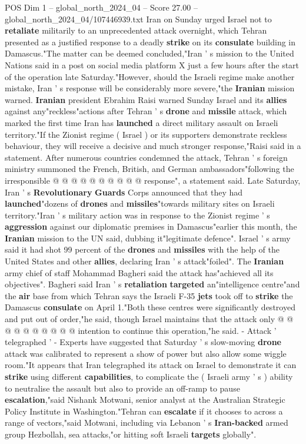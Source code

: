 \begin{textsample}{POS Dim 1 – global\_north\_2024\_04 – Score 27.00 – global\_north\_2024\_04/107446939.txt}  \label{ex:f1_pos_159}
Iran on Sunday urged Israel not to \textbf{retaliate} militarily to an unprecedented attack overnight, which Tehran presented as a justified response to a deadly \textbf{strike} on its \textbf{consulate} building in Damascus."The matter can be deemed concluded,"Iran ' s mission to the United Nations said in a post on social media platform X just a few hours after the start of the operation late Saturday."However, should the Israeli regime make another mistake, Iran ' s response will be considerably more severe,"the \textbf{Iranian} mission warned. \textbf{Iranian} president Ebrahim Raisi warned Sunday Israel and its \textbf{allies} against any"reckless"actions after Tehran ' s \textbf{drone} and \textbf{missile} attack, which marked the first time Iran has \textbf{launched} a direct military assault on Israeli territory."If the Zionist regime ( Israel ) or its supporters demonstrate reckless behaviour, they will receive a decisive and much stronger response,"Raisi said in a statement.
After numerous countries condemned the attack, Tehran ' s foreign ministry summoned the French, British, and German ambassadors"following the irresponsible @ @ @ @ @ @ @ @ @ @ response", a statement said.
Late Saturday, Iran ' s \textbf{Revolutionary} \textbf{Guards} Corps announced that they had \textbf{launched}"dozens of \textbf{drones} and \textbf{missiles}"towards military sites on Israeli territory."Iran ' s military action was in response to the Zionist regime ' s \textbf{aggression} against our diplomatic premises in Damascus"earlier this month, the \textbf{Iranian} mission to the UN said, dubbing it"legitimate defence".
Israel ' s army said it had shot 99 percent of the \textbf{drones} and \textbf{missiles} with the help of the United States and other \textbf{allies}, declaring Iran ' s attack"foiled".
The \textbf{Iranian} army chief of staff Mohammad Bagheri said the attack has"achieved all its objectives".
Bagheri said Iran ' s \textbf{retaliation} \textbf{targeted} an"intelligence centre"and the \textbf{air} base from which Tehran says the Israeli F-35 \textbf{jets} took off to \textbf{strike} the Damascus \textbf{consulate} on April 1."Both these centres were significantly destroyed and put out of order,"he said, though Israel maintains that the attack only @ @ @ @ @ @ @ @ @ @ intention to continue this operation,"he said. - Attack ' telegraphed ' - Experts have suggested that Saturday ' s slow-moving \textbf{drone} attack was calibrated to represent a show of power but also allow some wiggle room."It appears that Iran telegraphed its attack on Israel to demonstrate it can \textbf{strike} using different \textbf{capabilities}, to complicate the ( Israeli army ' s ) ability to neutralise the assault but also to provide an off-ramp to pause \textbf{escalation},"said Nishank Motwani, senior analyst at the Australian Strategic Policy Institute in Washington."Tehran can \textbf{escalate} if it chooses to across a range of vectors,"said Motwani, including via Lebanon ' s \textbf{Iran-backed} armed group Hezbollah, sea attacks,"or hitting soft Israeli \textbf{targets} globally".

\end{textsample}
